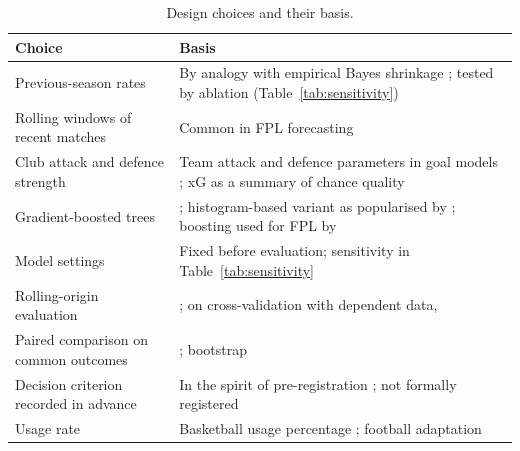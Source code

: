 \documentclass[11pt,a4paper]{article}
\begin{document}
\begin{table}[ht]
\centering
\small
\caption{Design choices and their basis.}
\label{tab:choices}
\begin{tabularx}{\textwidth}{>{\raggedright\arraybackslash}p{4.2cm}X}
\toprule
Choice & Basis \\
\midrule
Previous-season rates & By analogy with empirical Bayes shrinkage \citep{efronmorris1975,brown2008};
  tested by ablation (Table~\ref{tab:sensitivity}) \\
Rolling windows of recent matches & Common in FPL forecasting \citep{lombu2024,frees2024,ramezani2025} \\
Club attack and defence strength & Team attack and defence parameters in goal models
  \citep{maher1982,dixoncoles1997}; xG as a summary of chance quality \citep{rathke2017} \\
Gradient-boosted trees & \citet{friedman2001}; histogram-based variant as popularised by
  \citet{ke2017}; boosting used for FPL by \citet{frees2024} \\
Model settings & Fixed before evaluation; sensitivity in Table~\ref{tab:sensitivity} \\
Rolling-origin evaluation & \citet{tashman2000}; on cross-validation with dependent data,
  \citet{bergmeir2012} \\
Paired comparison on common outcomes & \citet{dieboldmariano1995}; bootstrap
  \citep{efron1993,kunsch1989,politis1994} \\
Decision criterion recorded in advance & In the spirit of pre-registration \citep{nosek2018}; not
  formally registered \\
Usage rate & Basketball usage percentage \citep{bbrefglossary,oliver2004}; football adaptation
  \citep{sincerefc2025a,sincerefc2025b} \\
\bottomrule
\end{tabularx}
\end{table}
\end{document}
